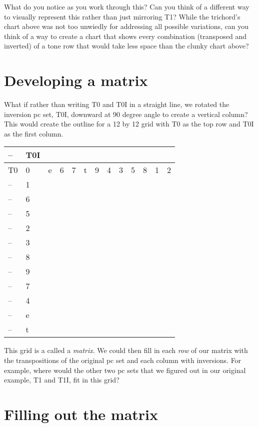 \documentclass{book}
\begin{document}
What do you notice as you work through this? Can you think of a different way
to visually represent this rather than just mirroring T1? While the trichord's
chart above was not too unwiedly for addressing all possible variations, can
you think of a way to create a chart that shows every combination (transposed
and inverted) of a tone row that would take less space than the clunky chart
above?

\hypertarget{developing-a-matrix}{%
\section{Developing a matrix}\label{developing-a-matrix}}

What if rather than writing T0 and T0I in a straight line, we rotated the
inversion pc set, T0I, downward at 90 degree angle to create a vertical
column? This would create the outline for a 12 by 12 grid with T0 as the top
row and T0I as the first column.

\begin{longtable}[]{@{}lllllllllllll@{}}
\toprule
-- & T0I & & & & & & & & & & & \\
\midrule
\endhead
T0 & 0 & e & 6 & 7 & t & 9 & 4 & 3 & 5 & 8 & 1 & 2 \\
-- & 1 & & & & & & & & & & & \\
-- & 6 & & & & & & & & & & & \\
-- & 5 & & & & & & & & & & & \\
-- & 2 & & & & & & & & & & & \\
-- & 3 & & & & & & & & & & & \\
-- & 8 & & & & & & & & & & & \\
-- & 9 & & & & & & & & & & & \\
-- & 7 & & & & & & & & & & & \\
-- & 4 & & & & & & & & & & & \\
-- & e & & & & & & & & & & & \\
-- & t & & & & & & & & & & & \\
\bottomrule
\end{longtable}

This grid is a called a \emph{matrix}. We could then fill in each \emph{row}
of our matrix with the transpositions of the original pc set and each column
with inversions. For example, where would the other two pc sets that we
figured out in our original example, T1 and T1I, fit in this grid?

\hypertarget{filling-out-the-matrix}{%
\section{Filling out the matrix}\label{filling-out-the-matrix}}
\end{document}
